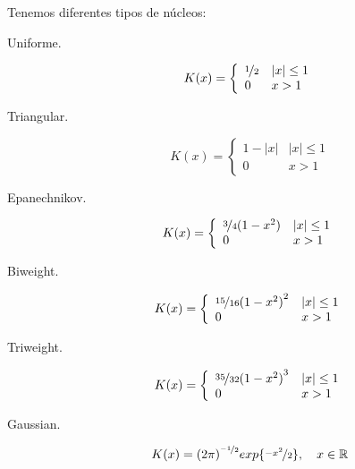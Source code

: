 \noindent
Tenemos diferentes tipos de núcleos:
\begin{description}
    \item [Uniforme.] 
        \begin{equation*}
            K(x) = \left\{\begin{array}{ll}
                    \nicefrac{1}{2} & |x|\leq 1 \\
                    0 & x > 1
            \end{array}\right.
        \end{equation*}
    \item [Triangular.] 
        \begin{equation*}
            K(x) = \left\{\begin{array}{ll}
                    1-|x| & |x|\leq 1 \\
                    0 & x > 1
            \end{array}\right.
        \end{equation*}
    \item [Epanechnikov.] 
        \begin{equation*}
            K(x) = \left\{\begin{array}{ll}
                    \nicefrac{3}{4}(1-x^2) & |x|\leq 1 \\
                    0 & x > 1
            \end{array}\right.
        \end{equation*}
    \item [Biweight.] 
        \begin{equation*}
            K(x) = \left\{\begin{array}{ll}
                    \nicefrac{15}{16}{(1-x^2)}^{2} & |x|\leq 1 \\
                    0 & x > 1
            \end{array}\right.
        \end{equation*}
    \item [Triweight.] 
        \begin{equation*}
            K(x) = \left\{\begin{array}{ll}
                    \nicefrac{35}{32}{(1-x^2)}^{3} & |x|\leq 1 \\
                    0 & x > 1
            \end{array}\right.
        \end{equation*}
    \item [Gaussian.] 
        \begin{equation*}
            K(x) = {(2\pi)}^{\nicefrac{-1}{2}} exp\{\nicefrac{-x^2}{2}\}, \quad x\in \mathbb{R}
        \end{equation*}
\end{description}

